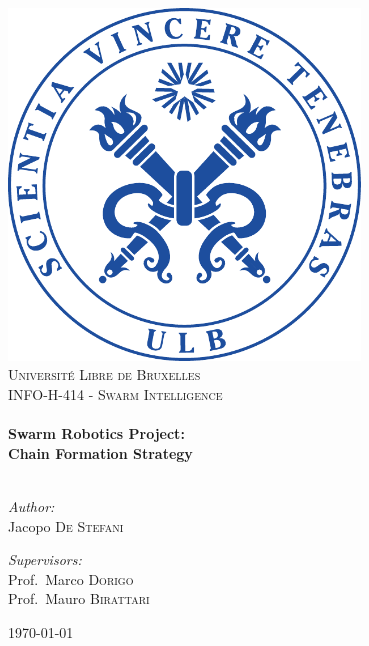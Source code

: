 \begin{titlepage}

\begin{center}


\includegraphics[width=0.70\textwidth]{./Figures/logo-ulb}\\[1cm]    

\textsc{\LARGE Université Libre de Bruxelles}\\[1.5cm]

\textsc{\Large INFO-H-414 - Swarm Intelligence}\\[0.5cm]


\HRule \\[0.4cm]
{ \huge \bfseries Swarm Robotics Project: \\ Chain Formation Strategy}\\[0.4cm]

\HRule \\[1cm]

\begin{minipage}{0.4\textwidth}
\begin{flushleft} \large
\emph{Author:}\\
Jacopo  \textsc{De Stefani}
\end{flushleft}
\end{minipage}
\begin{minipage}{0.4\textwidth}
\begin{flushright} \large
\emph{Supervisors:} \\
Prof.~Marco \textsc{Dorigo}\\
Prof.~Mauro \textsc{Birattari}
\end{flushright}
\end{minipage}

\vfill

{\large \today}

\end{center}

\end{titlepage}
